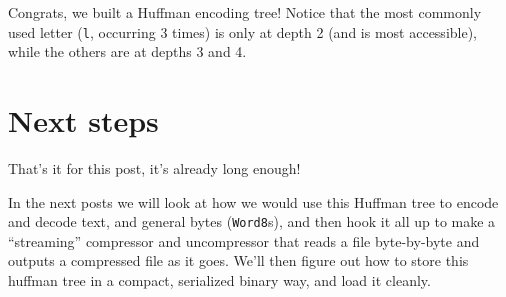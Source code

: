 \documentclass[]{article}
\newenvironment{Shaded}{}{}
\newcommand{\CharTok}[1]{\textcolor[rgb]{0.25,0.44,0.63}{#1}}
\newcommand{\DataTypeTok}[1]{\textcolor[rgb]{0.56,0.13,0.00}{#1}}
\newcommand{\NormalTok}[1]{#1}
\newcommand{\OperatorTok}[1]{\textcolor[rgb]{0.40,0.40,0.40}{#1}}
\newcommand{\StringTok}[1]{\textcolor[rgb]{0.25,0.44,0.63}{#1}}
\begin{document}
\begin{Shaded}
\end{Shaded}

Congrats, we built a Huffman encoding tree! Notice that the most commonly used
letter (\texttt{\textquotesingle{}l\textquotesingle{}}, occurring 3 times) is
only at depth 2 (and is most accessible), while the others are at depths 3 and
4.

\hypertarget{next-steps}{%
\section{Next steps}\label{next-steps}}

That's it for this post, it's already long enough!

In the next posts we will look at how we would use this Huffman tree to encode
and decode text, and general bytes (\texttt{Word8}s), and then hook it all up to
make a ``streaming'' compressor and uncompressor that reads a file byte-by-byte
and outputs a compressed file as it goes. We'll then figure out how to store
this huffman tree in a compact, serialized binary way, and load it cleanly.
\end{document}
